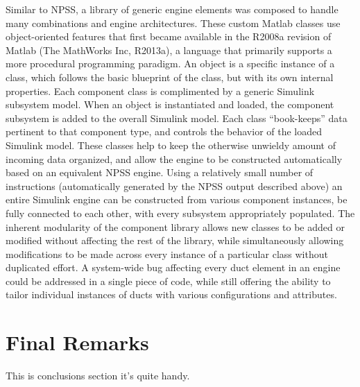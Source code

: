 \documentclass[heading.tex]{subfiles}
\begin{document}
Similar to NPSS, a library of generic engine elements was composed to handle many combinations and engine architectures. These custom Matlab classes use object-oriented features that first became available in the R2008a revision of Matlab (The MathWorks Inc, R2013a), a language that primarily supports a more procedural programming paradigm. An object is a specific instance of a class, which follows the basic blueprint of the class, but with its own internal properties. Each component class is complimented by a generic Simulink subsystem model. When an object is instantiated and loaded, the component subsystem is added to the overall Simulink model. Each class “book-keeps” data pertinent to that component type, and controls the behavior of the loaded Simulink model. These classes help to keep the otherwise unwieldy amount of incoming data organized, and allow the engine to be constructed automatically based on an equivalent NPSS engine. Using a relatively small number of instructions (automatically generated by the NPSS output described above) an entire Simulink engine can be constructed from various component instances, be fully connected to each other, with every subsystem appropriately populated.
	The inherent modularity of the component library allows new classes to be added or modified without affecting the rest of the library, while simultaneously allowing modifications to be made across every instance of a particular class without duplicated effort. A system-wide bug affecting every duct element in an engine could be addressed in a single piece of code, while still offering the ability to tailor individual instances of ducts with various configurations and attributes.

\section{Final Remarks}
This is conclusions section it's quite handy.
\end{document}
